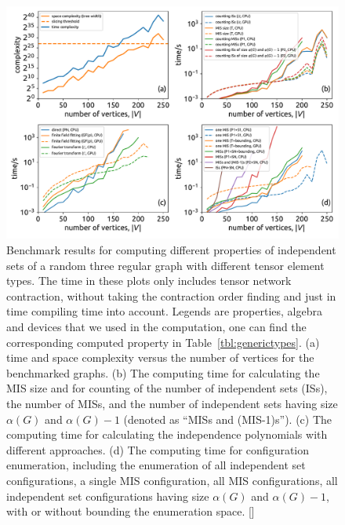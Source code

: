 \documentclass[onefignum, onetabnum]{siamart190516}
\newcommand{\<}{\langle}
\renewcommand{\>}{\rangle}
\newcommand{\Tbl}[1]{Table~\ref{#1}}
\newcommand{\red}[1]{[{\bf  \color{red}{ST: #1}}]}
\begin{document}
\begin{figure} 
    \centering
    \includegraphics[width=\textwidth, trim={0cm 0cm 0cm 0cm}, clip]{figures/fig1.pdf}
    \caption{Benchmark results for computing different properties of independent sets of a random three regular graph with different tensor element types.
    The time in these plots only includes tensor network contraction, without taking the contraction order finding and just in time compiling time into account.
    Legends are properties, algebra and devices that we used in the computation, one can find the corresponding computed property in \Tbl{tbl:generictypes}.
    (a) time and space complexity versus the number of vertices for the benchmarked graphs.
    (b) The computing time for calculating the MIS size and for counting of the number of independent sets (ISs), the number of MISs, and the number of independent sets having size $\alpha(G)$ and $\alpha(G)-1$ (denoted as ``MISs and (MIS-1)s'').
    (c) The computing time for calculating the independence polynomials with different approaches.
    (d) The computing time for configuration enumeration, including the enumeration of all independent set configurations, a single MIS configuration, all MIS configurations, all independent set configurations having size $\alpha(G)$ and $\alpha(G)-1$,  with or without bounding the enumeration space.
    \red{suggestions for the figure: 1. the legend seems to overlap the lines, especially the large sub-figure. Not sure what's a better way to include the legend there. 2. I see you guys don't typically use markers. We typically use markers to distinguish the different lines, as well as using the color. Especially, for some journals, there is a physical non-color copy, so some requires the figures to be understandable without colors.}
    }
    \label{fig:benchmark}
\end{figure}
\end{document}
